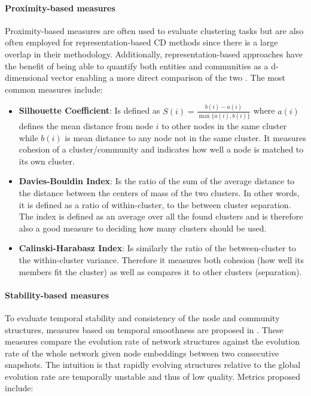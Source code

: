 \documentclass[
acmsmall,
nonacm,
screen,
acmthm]{acmart}
\providecommand{\tightlist}{%
\setlength{\itemsep}{0pt}\setlength{\parskip}{0pt}}
\begin{document}
\hypertarget{proximity-based-measures}{%
\paragraph{Proximity-based measures}\label{proximity-based-measures}}

Proximity-based measures are often used to evaluate clustering tasks but
are also often employed for representation-based CD methods since there
is a large overlap in their methodology. Additionally,
representation-based approaches have the benefit of being able to
quantify both entities and communities as a d-dimensional vector
enabling a more direct comparison of the two
\citep{wangVehicleTrajectoryClustering2020}. The most common measures
include:

\begin{itemize}
\tightlist
\item
  \textbf{Silhouette Coefficient}: Is defined as
  \(S(i)=\frac{b(i)-a(i)}{\max \{a(i), b(i)\}}\) where \(a(i)\) defines
  the mean distance from node \(i\) to other nodes in the same cluster
  while \(b(i)\) is mean distance to any node not in the same cluster.
  It measures cohesion of a cluster/community and indicates how well a
  node is matched to its own cluster.
\item
  \textbf{Davies-Bouldin Index}: Is the ratio of the sum of the average
  distance to the distance between the centers of mass of the two
  clusters. In other words, it is defined as a ratio of within-cluster,
  to the between cluster separation. The index is defined as an average
  over all the found clusters and is therefore also a good measure to
  deciding how many clusters should be used.
\item
  \textbf{Calinski-Harabasz Index}: Is similarly the ratio of the
  between-cluster to the within-cluster variance. Therefore it measures
  both cohesion (how well its members fit the cluster) as well as
  compares it to other clusters (separation).
\end{itemize}

\hypertarget{stability-based-measures}{%
\paragraph{Stability-based measures}\label{stability-based-measures}}

To evaluate temporal stability and consistency of the node and community
structures, measures based on temporal smoothness are proposed in
\citet{maCommunityawareDynamicNetwork2020}. These measures compare the
evolution rate of network structures against the evolution rate of the
whole network given node embeddings between two consecutive snapshots.
The intuition is that rapidly evolving structures relative to the global
evolution rate are temporally unstable and thus of low quality. Metrics
proposed include:
\end{document}
